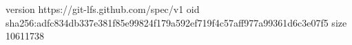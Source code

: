 version https://git-lfs.github.com/spec/v1
oid sha256:adfc834db337e381f85e99824f179a592ef719f4c57aff977a99361d6c3e07f5
size 10611738
